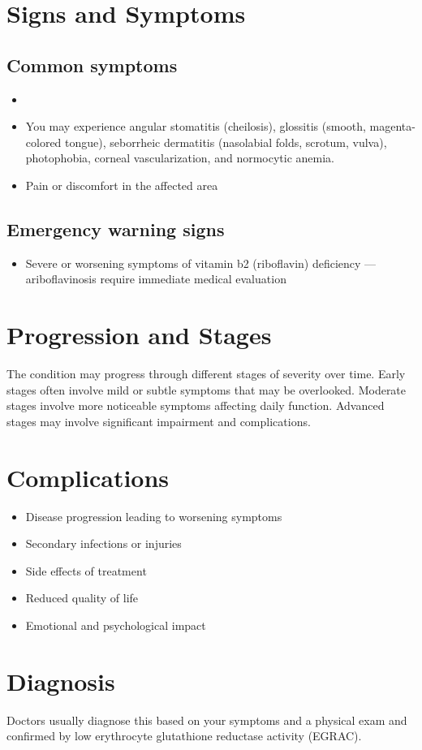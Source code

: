 \section{Signs and Symptoms}
\subsection{Common symptoms}
\begin{itemize}[noitemsep]
  \item \item You may experience angular stomatitis (cheilosis), glossitis (smooth, magenta-colored tongue), seborrheic dermatitis (nasolabial folds, scrotum, vulva), photophobia, corneal vascularization, and normocytic anemia.
  \item Pain or discomfort in the affected area
  \end{itemize}
\subsection{Emergency warning signs}
\begin{itemize}[noitemsep]
  \item Severe or worsening symptoms of vitamin b2 (riboflavin) deficiency --- ariboflavinosis require immediate medical evaluation
\end{itemize}
\section{Progression and Stages}
The condition may progress through different stages of severity over time. Early stages often involve mild or subtle symptoms that may be overlooked. Moderate stages involve more noticeable symptoms affecting daily function. Advanced stages may involve significant impairment and complications.
\section{Complications}
\begin{itemize}[noitemsep]
  \item Disease progression leading to worsening symptoms
  \item Secondary infections or injuries
  \item Side effects of treatment
  \item Reduced quality of life
  \item Emotional and psychological impact
\end{itemize}
\section{Diagnosis}
Doctors usually diagnose this based on your symptoms and a physical exam and confirmed by low erythrocyte glutathione reductase activity (EGRAC).

